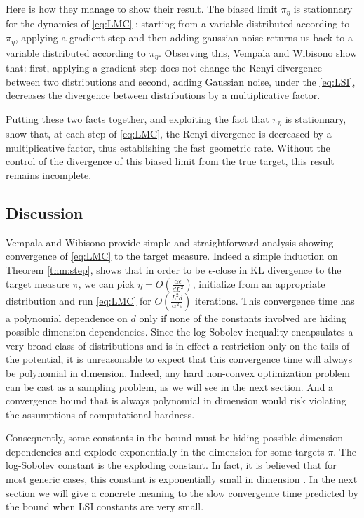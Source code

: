 \documentclass[10pt,journal,a4paper]{IEEEtran}
\theoremstyle{definition}
\begin{document}
Here is how they manage to show their result. The biased limit $\pi_\eta$ is stationnary for the dynamics of \eqref{eq:LMC} : starting from a variable distributed according to $\pi_\eta$, applying a gradient step and then adding gaussian noise returns us back to a variable distributed according to $\pi_\eta$. Observing this, Vempala and Wibisono show that: first, applying a gradient step does not change the Renyi divergence between two distributions and second, adding Gaussian noise, under the \eqref{eq:LSI}, decreases the divergence between distributions by a multiplicative factor.

Putting these two facts together, and exploiting the fact that $\pi_\eta$ is stationnary, \cite{vempala_rapid_2019} show that, at each step of \eqref{eq:LMC}, the Renyi divergence is decreased by a multiplicative factor, thus establishing the fast geometric rate. Without the control of the divergence of this biased limit from the true target, this result remains incomplete.

\subsection{Discussion}

Vempala and Wibisono provide simple and straightforward analysis showing convergence of \eqref{eq:LMC} to the target measure. Indeed a simple induction on Theorem \ref{thm:step}, shows that in order to be $\epsilon$-close in KL divergence to the target measure $\pi$, we can pick $\eta = O(\frac{\alpha \epsilon}{dL^2})$, initialize from an appropriate distribution and run \eqref{eq:LMC} for 
\(
O\left(\frac{L^2d}{\alpha^2\epsilon}\right)
\)
iterations. This convergence time has a polynomial dependence on $d$ only if none of the constants involved are hiding possible dimension dependencies. Since the log-Sobolev inequality encapsulates a very broad class of distributions and is in effect a restriction only on the tails of the potential, it is unreasonable to expect that this convergence time will always be polynomial in dimension. Indeed, any hard non-convex optimization problem can be cast as a sampling problem, as we will see in the next section. And a convergence bound that is always polynomial in dimension  would risk violating the assumptions of computational hardness.

Consequently, some constants in the bound must be hiding possible dimension dependencies and explode exponentially in the dimension for some targets $\pi$. The log-Sobolev constant is the exploding constant. In fact, it is believed that for most generic cases, this constant is exponentially small in dimension \cite{raginsky_non-convex_2017}. In the next section we will give a concrete meaning to the slow convergence time predicted by the bound when LSI constants are very small.
\end{document}
